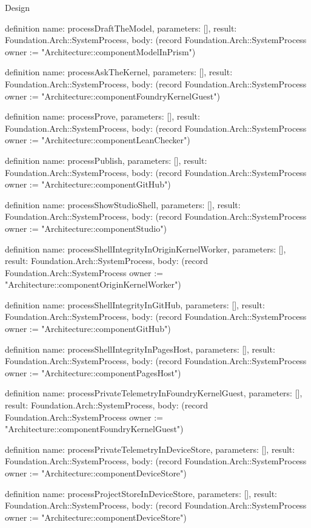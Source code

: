 \begin{lexlean}{Design}
\begin{semanticmodule}
definition{
  name: processDraftTheModel,
  parameters: [],
  result: Foundation.Arch::SystemProcess,
  body: (record Foundation.Arch::SystemProcess {owner := "Architecture::componentModelInPrism"})
}

definition{
  name: processAskTheKernel,
  parameters: [],
  result: Foundation.Arch::SystemProcess,
  body: (record Foundation.Arch::SystemProcess {owner := "Architecture::componentFoundryKernelGuest"})
}

definition{
  name: processProve,
  parameters: [],
  result: Foundation.Arch::SystemProcess,
  body: (record Foundation.Arch::SystemProcess {owner := "Architecture::componentLeanChecker"})
}

definition{
  name: processPublish,
  parameters: [],
  result: Foundation.Arch::SystemProcess,
  body: (record Foundation.Arch::SystemProcess {owner := "Architecture::componentGitHub"})
}

definition{
  name: processShowStudioShell,
  parameters: [],
  result: Foundation.Arch::SystemProcess,
  body: (record Foundation.Arch::SystemProcess {owner := "Architecture::componentStudio"})
}

definition{
  name: processShellIntegrityInOriginKernelWorker,
  parameters: [],
  result: Foundation.Arch::SystemProcess,
  body: (record Foundation.Arch::SystemProcess {owner := "Architecture::componentOriginKernelWorker"})
}

definition{
  name: processShellIntegrityInGitHub,
  parameters: [],
  result: Foundation.Arch::SystemProcess,
  body: (record Foundation.Arch::SystemProcess {owner := "Architecture::componentGitHub"})
}

definition{
  name: processShellIntegrityInPagesHost,
  parameters: [],
  result: Foundation.Arch::SystemProcess,
  body: (record Foundation.Arch::SystemProcess {owner := "Architecture::componentPagesHost"})
}

definition{
  name: processPrivateTelemetryInFoundryKernelGuest,
  parameters: [],
  result: Foundation.Arch::SystemProcess,
  body: (record Foundation.Arch::SystemProcess {owner := "Architecture::componentFoundryKernelGuest"})
}

definition{
  name: processPrivateTelemetryInDeviceStore,
  parameters: [],
  result: Foundation.Arch::SystemProcess,
  body: (record Foundation.Arch::SystemProcess {owner := "Architecture::componentDeviceStore"})
}

definition{
  name: processProjectStoreInDeviceStore,
  parameters: [],
  result: Foundation.Arch::SystemProcess,
  body: (record Foundation.Arch::SystemProcess {owner := "Architecture::componentDeviceStore"})
}


\end{semanticmodule}
\end{lexlean}
